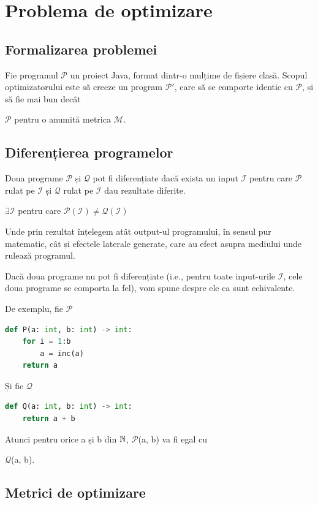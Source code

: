 \newcommand{\s}[1]{
	\(\mathcal{#1}\)}

\chapter{Problema de optimizare}

\section{Formalizarea problemei}

Fie programul \s{P} un proiect Java, format dintr-o mulțime de fișiere
clasă.  Scopul optimizatorului este să creeze un program \s{P'}, care
să se comporte identic cu \s{P}, și să fie mai bun decât
\s{P} pentru o anumită metrica \s{M}.

\section{Diferențierea programelor}

Doua programe \s{P} și \s{Q} pot fi diferențiate dacă
exista un input \s{I} pentru care \s{P} rulat pe \s{I}
și \s{Q} rulat pe \s{I} dau rezultate diferite.

\(\exists \mathcal{I}\) pentru care \(\mathcal{P}(\mathcal{I}) \ne
\mathcal{Q}(\mathcal{I}) \)

Unde prin rezultat înțelegem atât output-ul programului, în
sensul pur matematic, cât și efectele laterale generate, care au
efect asupra mediului unde rulează programul.

Dacă doua programe nu pot fi diferențiate (i.e., pentru toate
input-urile \s{I}, cele doua programe se comporta la fel), vom
spune despre ele ca sunt echivalente.

De exemplu, fie \s{P}

\begin{lstlisting}[language=Python,label={programul_p}]
def P(a: int, b: int) -> int:
    for i = 1:b
        a = inc(a)
    return a
\end{lstlisting}

Și fie \s{Q}

\begin{lstlisting}[language=Python,label={programul_q}]
def Q(a: int, b: int) -> int:
    return a + b
\end{lstlisting}

Atunci pentru orice a și b din $\mathbb{N}$, \s{P}(a, b) va fi egal cu
\s{Q}(a, b).

\section{Metrici de optimizare}

